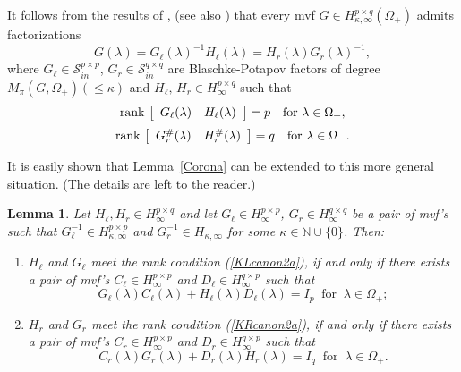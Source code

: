 \documentclass[12pt,twoside,a4paper]{amsart}
\newtheorem{lem}[thm]{Lemma}
\theoremstyle{definition}
\numberwithin{equation}{section}
\begin{document}
It follows from the results of \cite{KL}, \cite{Der03} (see also
\cite[Theorem 5.2]{Ki}) that every  mvf $G\in
H_{\kappa,\infty}^{p\times q}(\Omega_+)$ admits 
factorizations
\begin{equation}\label{eq:7.110}
  G(\lambda)=G_\ell(\lambda)^{-1}H_\ell(\lambda)=H_r(\lambda)G_r(\lambda)^{-1},
\end{equation}
where $G_\ell\in {\mathcal S}_{in}^{p\times p}$, $G_r\in {{\mathcal S}}_{in}^{q\times q}$ are
Blaschke-Potapov factors of degree $M_{\pi} (G, \Omega_+)(\le\kappa)$ and
$H_\ell,\,H_r\in H_{\infty}^{p\times q}$ such that
\begin{equation}\label{KLcanon2a}
{{\rm rank\,}} \left[\begin{array}{cc}
 G_\ell({\lambda}) & H_\ell({\lambda})
\end{array}\right]
=p\quad\text{for}\ {\lambda}\in\Omega_+,
\end{equation}
\begin{equation}\label{KRcanon2a}
{{\rm rank\,}} \left[\begin{array}{cc}
 G_r^\#({\lambda}) & H^\#_r({\lambda})
\end{array}\right]
=q\quad \text{for} \ {\lambda}\in\Omega_-.
\end{equation}

It is easily shown  that Lemma~\ref{Corona} can be extended to this more general
situation. (The details are left to the reader.)

\begin{lem}\label{CoronaA}
 Let $H_\ell, H_r\in H_{\infty}^{p\times q}$ and let
 $G_\ell\in H_\infty^{p\times p}$, $G_r\in H_{\infty}^{q\times q}$ be a pair
 of mvf's such that $
G_\ell^{-1}\in H_{\kappa,\infty}^{p\times p}$ and
$G_r^{-1}\in H_{\kappa,\infty}$ for some
$\kappa\in{{\mathbb N}}\cup\{0\}$. Then:
\begin{enumerate}
\item[(i)]  $H_\ell$ and $G_\ell$ meet the rank condition
(\ref{KLcanon2a}), if and only if there exists a pair of mvf's
$C_\ell\in H^{p\times p}_\infty$ and $D_\ell\in H^{q\times
p}_\infty$ such that
\begin{equation}\label{CorFormulaA}
G_\ell({\lambda})C_\ell({\lambda})+H_\ell({\lambda})D_\ell({\lambda})=I_p\ \text{ for }\
{\lambda}\in \Omega_+;
\end{equation}
\item[(ii)]  $H_r$ and $G_r$ meet the rank condition
(\ref{KRcanon2a}), if and only if there exists a pair of mvf's
$C_r\in H^{p\times p}_\infty$ and $D_r\in H^{q\times p}_\infty$
such that
\begin{equation}\label{CorFormula1A}
C_r({\lambda})G_r({\lambda})+D_r({\lambda})H_r({\lambda})=I_q\ \text{ for }\ {\lambda}\in
\Omega_+.
\end{equation}
\end{enumerate}
\end{lem}
\end{document}
